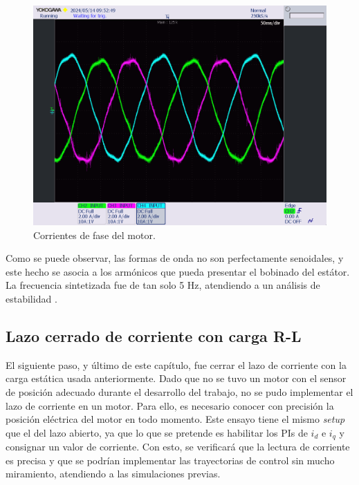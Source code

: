 \begin{figure}[H]
	\centering
	\includegraphics[width=0.7\linewidth]{fig/mavilorCurrent}
	\caption{Corrientes de fase del motor.}
\end{figure}

Como se puede observar, las formas de onda no son perfectamente senoidales, y este hecho se asocia a los armónicos que pueda presentar el bobinado del estátor. La frecuencia sintetizada fue de tan solo 5 Hz, atendiendo a un análisis de estabilidad \cite{Montesinos2008}.


\subsection{Lazo cerrado de corriente con carga R-L}

El siguiente paso, y último de este capítulo, fue cerrar el lazo de corriente con la carga estática usada anteriormente. Dado que no se tuvo un motor con el sensor de posición adecuado durante el desarrollo del trabajo, no se pudo implementar el lazo de corriente en un motor. Para ello, es necesario conocer con precisión la posición eléctrica del motor en todo momento. Este ensayo tiene el mismo \textit{setup} que el del lazo abierto, ya que lo que se pretende es habilitar los PIs de $i_d$ e $i_q$ y consignar un valor de corriente. Con esto, se verificará que la lectura de corriente es precisa y que se podrían implementar las trayectorias de control sin mucho miramiento, atendiendo a las simulaciones previas.



